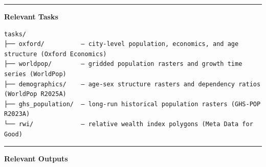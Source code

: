 \documentclass[
  letterpaper,
  DIV=11,
  numbers=noendperiod]{scrreprt}
\begin{document}
\begin{center}\rule{0.5\linewidth}{0.5pt}\end{center}

\textbf{Relevant Tasks}

\begin{verbatim}
tasks/
├── oxford/          — city-level population, economics, and age structure (Oxford Economics)
├── worldpop/        — gridded population rasters and growth time series (WorldPop)
├── demographics/    — age-sex structure rasters and dependency ratios (WorldPop R2025A)
├── ghs_population/  — long-run historical population rasters (GHS-POP R2023A)
└── rwi/             — relative wealth index polygons (Meta Data for Good)
\end{verbatim}

\begin{center}\rule{0.5\linewidth}{0.5pt}\end{center}

\textbf{Relevant Outputs}
\end{document}
